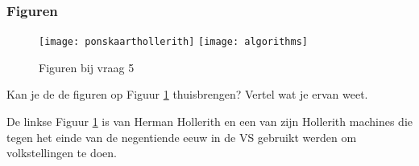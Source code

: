 \documentclass[../main.tex]{subfiles}
\begin{document}
\subsubsection{Figuren}

\begin{figure}[h!]
	\begin{center}
		\texttt{[image: ponskaarthollerith]}
		\texttt{[image: algorithms]}
	\end{center}
	\caption{Figuren bij vraag 5}
	\label{fig:vraag5}
\end{figure}

\begin{question}
Kan je de de figuren op Figuur \ref{fig:vraag5} thuisbrengen? Vertel wat je ervan weet.
\end{question}
De linkse Figuur \ref{fig:vraag5} is van Herman Hollerith en een van zijn Hollerith machines die tegen het einde van de negentiende eeuw in de VS gebruikt werden om volkstellingen te doen.
\end{document}
